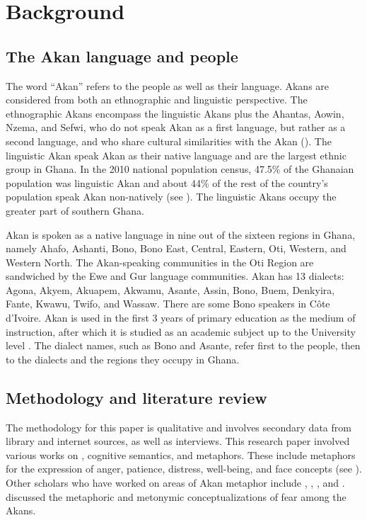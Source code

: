 \documentclass[output=paper,colorlinks,citecolor=brown]{langscibook}
\begin{document}
\section{Background} \label{07_Background}
\subsection{The Akan language and people}

The word ``Akan'' refers to the people as well as their language. Akans are considered from both an ethnographic and linguistic perspective. The ethnographic Akans encompass the linguistic Akans plus the Ahantas, Aowin, Nzema, and Sefwi, who do not speak Akan as a first language, but rather as a second language, and who share cultural similarities with the Akan (\cite{Obeng-Gyasi1987}). The linguistic Akan speak Akan as their native language and are the largest ethnic group in Ghana. In the 2010 national population census, 47.5\% of the Ghanaian population was linguistic Akan and about 44\% of the rest of the country's population speak Akan non-natively (see \cite{Agyekum2020}). The linguistic Akans occupy the greater part of southern Ghana.

Akan is spoken as a native language in nine out of the sixteen regions in Ghana, namely Ahafo, Ashanti, Bono, Bono East, Central, Eastern, Oti, Western, and Western North. The Akan-speaking communities in the Oti Region are sandwiched by the Ewe and Gur language communities. Akan has 13 dialects: Agona, Akyem, Akuapem, Akwamu, Asante, Assin, Bono, Buem, Denkyira, Fante, Kwawu, Twifo, and Wassaw. There are some Bono speakers in Côte d’Ivoire. Akan is used in the first 3 years of primary education as the medium of instruction, after which it is studied as an academic subject up to the University level \citep[2]{Agyekum2020}. The dialect names, such as Bono and Asante, refer first to the people, then to the dialects and the regions they occupy in Ghana.

\subsection{Methodology and literature review}

The methodology for this paper is qualitative and involves secondary data from library and internet sources, as well as interviews. This research paper involved various works on , cognitive semantics, and metaphors. These include metaphors for the expression of anger, patience, distress, well-being, and face concepts (see \cite{Agyekum2006From, Agyekum2015a, Agyekum2015b, Agyekum2016, Agyekum2018, Agyekum2020}). Other scholars who have worked on areas of Akan metaphor include \citet{Ansah2014}, \citet{Dzokoto2010}, \citet{DzokotoandOkazaki2006}, and \citet{Gyekye1997}. \citet{Ansah2014} discussed the metaphoric and metonymic conceptualizations of fear among the Akans. 
\end{document}
